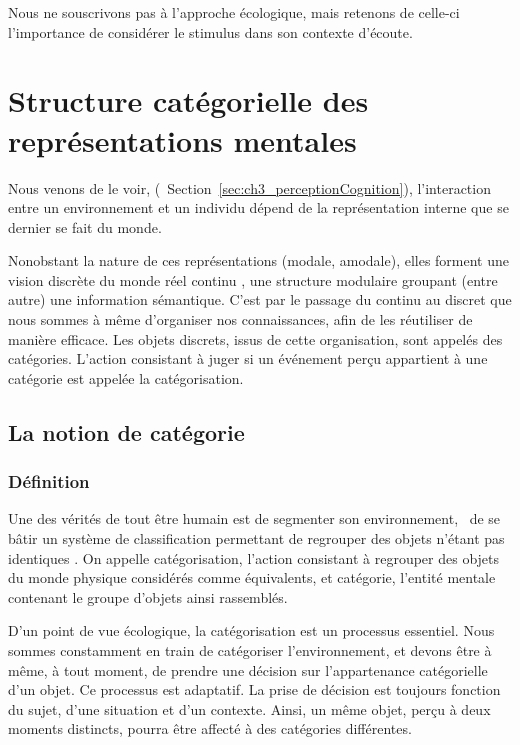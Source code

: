 Nous ne souscrivons pas à l'approche écologique, mais retenons de celle-ci l'importance de considérer le stimulus dans son contexte d'écoute.

\section{Structure catégorielle des représentations mentales}
\label{sec:ch3_representationMentale}
 
Nous venons de le voir, (\cf~Section~\ref{sec:ch3_perceptionCognition}), l'interaction entre un environnement et un individu dépend de la représentation interne que se dernier se fait du monde.
 
Nonobstant la nature de ces représentations (modale, amodale), elles forment une vision discrète du monde réel continu \citep{houde1998vocabulaire}, une structure modulaire groupant (entre autre) une information sémantique. C'est par le passage du continu au discret que nous sommes à même d'organiser nos connaissances, afin de les réutiliser de manière efficace. Les objets discrets, issus de cette organisation, sont appelés des catégories. L'action consistant à juger si un événement perçu appartient à une catégorie est appelée la catégorisation.
 
\subsection{La notion de catégorie}

\subsubsection{Définition}
\label{sec:ch3_categorieDef}

Une des vérités de tout être humain est de segmenter son environnement, \ie~de se bâtir un système de classification permettant de regrouper des objets n'étant pas identiques \citep[p. 1]{rosch1978cognition}. On appelle catégorisation, l'action consistant à regrouper des objets du monde physique considérés comme équivalents, et catégorie, l'entité mentale contenant le groupe d'objets ainsi rassemblés. 
 
D'un point de vue écologique, la catégorisation est un processus essentiel. Nous sommes constamment en train de catégoriser l'environnement, et devons être à même, à tout moment, de prendre une décision sur l'appartenance catégorielle d'un objet. Ce processus est adaptatif. La prise de décision est toujours fonction du sujet, d'une situation et d'un contexte. Ainsi, un même objet, perçu à deux moments distincts, pourra être affecté à des catégories différentes. 

